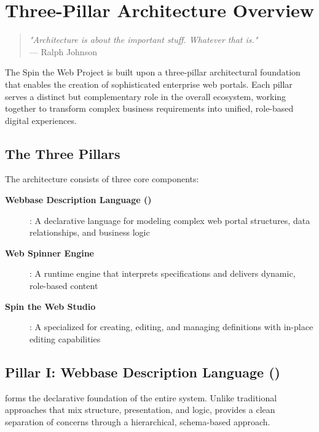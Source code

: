 
\chapter{Three-Pillar Architecture Overview}
\label{chap:architecture}

\begin{quote}
\textit{"Architecture is about the important stuff. Whatever that is."} \\
— Ralph Johnson
\end{quote}

The Spin the Web Project is built upon a three-pillar architectural foundation that enables the creation of sophisticated enterprise web portals. Each pillar serves a distinct but complementary role in the overall ecosystem, working together to transform complex business requirements into unified, role-based digital experiences.

\section{The Three Pillars}
\label{sec:three-pillars}

The architecture consists of three core components:

\begin{description}
\item[\textbf{Webbase Description Language (\wbdl{})}]: A declarative language for modeling complex web portal structures, data relationships, and business logic
\item[\textbf{Web Spinner Engine}]: A runtime engine that interprets \wbdl{} specifications and delivers dynamic, role-based content
\item[\textbf{Spin the Web Studio}]: A specialized \webbaselet{} for creating, editing, and managing \webbase{} definitions with in-place editing capabilities
\end{description}

\section{Pillar I: Webbase Description Language (\wbdl{})}
\label{sec:pillar-wbdl}

\wbdl{} forms the declarative foundation of the entire system. Unlike traditional approaches that mix structure, presentation, and logic, \wbdl{} provides a clean separation of concerns through a hierarchical, schema-based approach.

